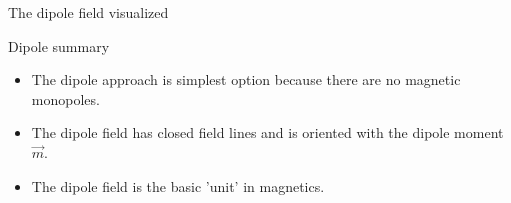 \begin{frame}
\begin{PointSix}{The dipole field visualized}
  \end{PointSix}
\end{frame}

\begin{frame}
\begin{PointSix}{Dipole summary}
  \begin{itemize}
    \item The dipole approach is simplest option because there are \alert{no magnetic monopoles}. 
    \item The dipole field has closed field lines and is oriented with the dipole moment $\vec{m}$.
    \item The dipole field is the basic 'unit' in magnetics.
  \end{itemize}
\end{PointSix}
\end{frame}

